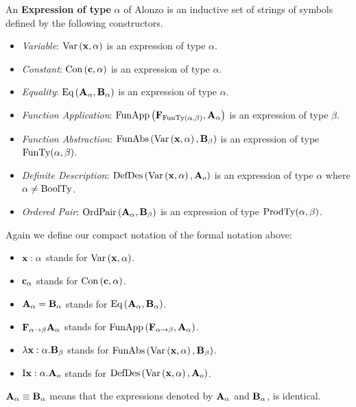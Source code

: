 \begin{define}
    An \textbf{Expression of type} $\alpha$ of Alonzo is an inductive set of strings of symbols defined by the following constructors.
    \begin{itemize}
        \item \textit{Variable}: $\text{Var}\left(\bold{x}, \alpha\right)$ is an expression of type $\alpha$.
        \item \textit{Constant}: $\text{Con}\left(\bold{c}, \alpha\right)$ is an expression of type $\alpha$.
        \item \textit{Equality}: $\text{Eq}\left(\bold{A}_{\alpha}, \bold{B}_{\alpha}\right)$ is an expression of type $\alpha$.
        \item \textit{Function Application}: $\text{FunApp}\left(\bold{F}_{\text{FunTy}(\alpha, \beta)}, \bold{A}_{\alpha}\right)$ is an expression of type $\beta$.
        \item \textit{Function Abstraction}: $\text{FunAbs}\left(\text{Var}\left(\bold{x}, \alpha\right), \bold{B}_{\beta}\right)$ is an expression of type $\text{FunTy}(\alpha, \beta)$.
        \item \textit{Definite Description}: $\text{DefDes}\left(\text{Var}\left(\bold{x}, \alpha\right), \bold{A}_{o}\right)$ is an expression of type $\alpha$ where $\alpha \not = \text{BoolTy}$.
        \item \textit{Ordered Pair}: $\text{OrdPair}\left(\bold{A}_{\alpha}, \bold{B}_{\beta}\right)$ is an expression of type $\text{ProdTy}(\alpha, \beta)$.
    \end{itemize}
\end{define}

Again we define our compact notation of the formal notation above:
\begin{itemize}
    \item $\bold{x}: \alpha$ stands for $\text{Var}\left(\bold{x}, \alpha\right)$.
    \item $\bold{c}_{\alpha}$ stands for $\text{Con}\left(\bold{c}, \alpha\right)$.
    \item $\bold{A}_{\alpha} = \bold{B}_{\alpha}$ stands for $\text{Eq}\left(\bold{A}_{\alpha}, \bold{B}_{\alpha}\right)$.
    \item $\bold{F}_{\alpha \rightarrow \beta} \bold{A}_{\alpha}$ stands for $\text{FunApp}\left(\bold{F}_{\alpha \rightarrow \beta}, \bold{A}_{\alpha}\right)$.
    \item $\lambda \bold{x}: {\alpha} . \bold{B}_{\beta}$ stands for $\text{FunAbs}\left(\text{Var}\left(\bold{x}, \alpha\right), \bold{B}_{\beta}\right)$.
    \item $\text{I}\bold{x}: {\alpha} . \bold{A}_{o}$ stands for $\text{DefDes}\left(\text{Var}\left(\bold{x}, \alpha\right), \bold{A}_{o}\right)$.
\end{itemize}

\begin{callout}
    $\bold{A}_{\alpha} \equiv \bold{B}_{\alpha}$ means that the expressions denoted by $\bold{A}_{\alpha}$ and $\bold{B}_{\alpha}$, is identical.
\end{callout}

